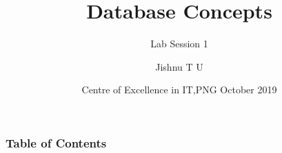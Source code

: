 \documentclass[hyperref={bookmarks=false},aspectratio=169]{beamer}
\title[PPT Title]
{\bfseries{Database Concepts}}
\subtitle{Lab Session 1}
\author[Jishnu T U] %
{Jishnu T U\inst{1} } %
\institute[CEIT]
{
  \inst{1}
  Trainer\\
  Centre of Excellence in IT,PNG
}
\date[CEIT, 2014]
{Centre of Excellence in IT,PNG October 2019}
\begin{document}
\frame{\titlepage}  %

\begin{frame}
\frametitle{Table of Contents}
\tableofcontents
\end{frame}









\end{document}
